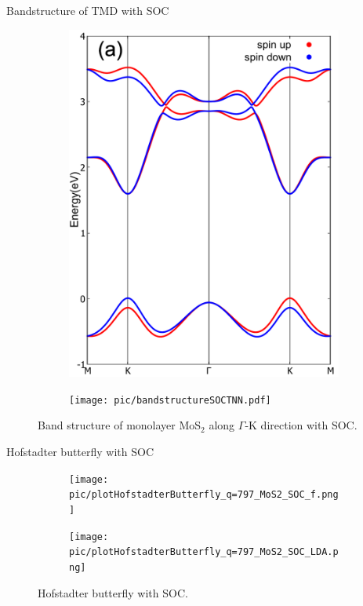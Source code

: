 \documentclass[aspectratio=169,compress,x11names]{beamer}
\begin{document}
	\begin{frame}{Bandstructure of TMD with SOC}
		\begin{figure}
			\begin{subfigure}[b]{0.495\textwidth}
				\centering
				\includegraphics[width=0.6\linewidth]{pic/bandstructureSOC.pdf}
			\end{subfigure}
			\begin{subfigure}[b]{0.495\textwidth}
				\centering
				\texttt{[image: pic/bandstructureSOCTNN.pdf]}
			\end{subfigure}
			\caption{Band structure of monolayer MoS$_{2}$ along $\Gamma$-K direction with SOC.}
		\end{figure}
	\end{frame}
	\begin{frame}{Hofstadter butterfly with SOC}
		\begin{figure}
			\begin{subfigure}[b]{0.495\textwidth}
				\centering
				\texttt{[image: pic/plotHofstadterButterfly\_q=797\_MoS2\_SOC\_f.png]}
			\end{subfigure}
			\begin{subfigure}[b]{0.495\textwidth}
				\centering
				\texttt{[image: pic/plotHofstadterButterfly\_q=797\_MoS2\_SOC\_LDA.png]}
			\end{subfigure}
			\caption{Hofstadter butterfly with SOC.}
		\end{figure}
	\end{frame}
	
\end{document}
